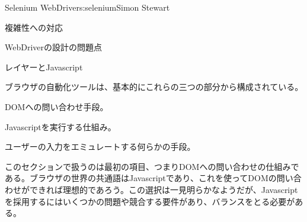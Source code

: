 \begin{aosachapter}{Selenium WebDriver}{s:selenium}{Simon Stewart}
\begin{aosasect1}{複雑性への対応}
\begin{aosasect2}{WebDriverの設計の問題点}
\end{aosasect2}

\end{aosasect1}

\begin{aosasect1}{レイヤーとJavascript}
\label{sec.selenium.layers}

ブラウザの自動化ツールは、基本的にこれらの三つの部分から構成されている。

\begin{aosaitemize}

\item DOMへの問い合わせ手段。

\item Javascriptを実行する仕組み。

\item ユーザーの入力をエミュレートする何らかの手段。

\end{aosaitemize}

このセクションで扱うのは最初の項目、つまりDOMへの問い合わせの仕組みである。ブラウザの世界の共通語はJavascriptであり、これを使ってDOMの問い合わせができれば理想的であろう。この選択は一見明らかなようだが、Javascriptを採用するにはいくつかの問題や競合する要件があり、バランスをとる必要がある。


\end{aosasect1}
\end{aosachapter}

